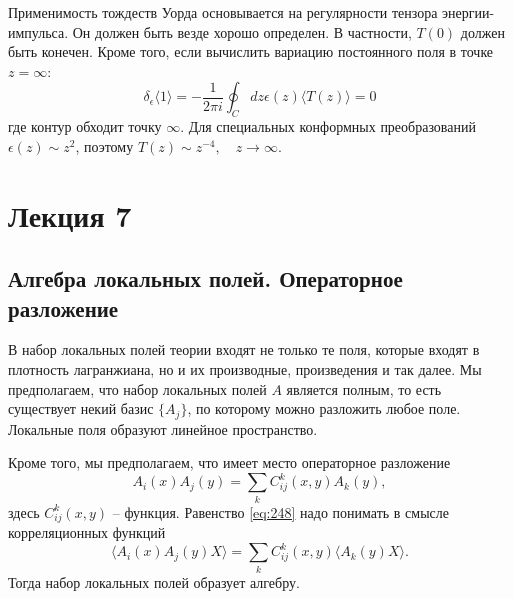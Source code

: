 \documentclass[a4paper,12pt]{article}
\theoremstyle{definition}
\theoremstyle{definition}
\theoremstyle{definition}
\begin{document}
Применимость тождеств Уорда основывается на регулярности тензора энергии-импульса. Он должен быть везде хорошо определен. В частности, $T(0)$ должен быть конечен. Кроме того, если вычислить вариацию постоянного поля в точке $z=\infty$:
\begin{equation}
  \label{eq:247}
  \delta_{\epsilon} \langle 1\rangle =-\frac{1}{2\pi i} \oint_{C}dz \epsilon(z) \langle T(z)\rangle =0
\end{equation}
где контур обходит точку $\infty$. Для специальных конформных преобразований $\epsilon(z)\sim z^{2}$, поэтому $T(z)\sim z^{-4},\quad z\to \infty$.

\section{Лекция 7}
\label{sec:lecture-7}

\subsection{Алгебра локальных полей. Операторное разложение}
\label{sec:ope}

В набор локальных полей теории входят не только те поля, которые входят в плотность лагранжиана, но и их производные, произведения и так далее.
Мы предполагаем, что набор локальных полей $A$ является полным, то есть существует некий базис $\{ A_{j}\}$, по которому можно разложить любое поле. Локальные поля образуют линейное пространство.

Кроме того, мы предполагаем, что имеет место операторное разложение
\begin{equation}
  \label{eq:248}
  A_{i}(x)A_{j}(y) =\sum_{k} C^{k}_{ij} (x,y) A_{k}(y),
\end{equation}
здесь $C_{ij}^{k}(x,y)$ -- функция. Равенство \eqref{eq:248} надо понимать в смысле корреляционных функций
\begin{equation}
  \label{eq:249}
  \langle A_{i}(x) A_{j}(y) X\rangle = \sum_{k} C^{k}_{ij} (x,y) \langle A_{k}(y) X\rangle.
\end{equation}
Тогда набор локальных полей образует алгебру. 
\end{document}
